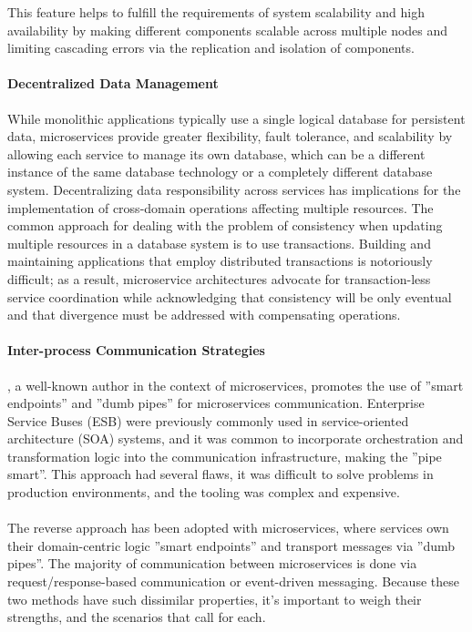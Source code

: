 This feature helps to fulfill the requirements of system scalability and high availability by
making different components scalable across multiple nodes and limiting cascading errors via the replication and isolation of components.

\paragraph{Decentralized Data Management}

While monolithic applications typically use a single logical database for persistent data, microservices provide greater flexibility, fault tolerance,
and scalability by allowing each service to manage its own database, which can be a different instance of the same database technology or a completely different database system.
Decentralizing data responsibility across services has implications for the implementation of cross-domain operations affecting multiple resources.
The common approach for dealing with the problem of consistency when updating multiple resources in a database system is to use transactions.
Building and maintaining applications that employ distributed transactions is notoriously difficult; as a result,
microservice architectures advocate for transaction-less service coordination while acknowledging
that consistency will be only eventual and that divergence must be addressed with compensating operations.

\paragraph{Inter-process Communication Strategies}

\citeauthor{microservices}, a well-known author in the context of microservices, promotes the use of ''smart endpoints'' and ''dumb pipes'' for microservices communication.
Enterprise Service Buses (ESB) \cite{esb} were previously commonly used in service-oriented architecture (SOA) systems,
and it was common to incorporate orchestration and transformation logic into the communication infrastructure,
making the ''pipe smart''.
This approach had several flaws, it was difficult to solve problems in production environments, and the tooling was complex and expensive.

\paragraph{}

The reverse approach has been adopted with microservices,
where services own their domain-centric logic ''smart endpoints'' and transport messages via ''dumb pipes''.
The majority of communication between microservices is done via request/response-based communication or event-driven messaging.
Because these two methods have such dissimilar properties, it's important to weigh their strengths, and the scenarios that call for each.

